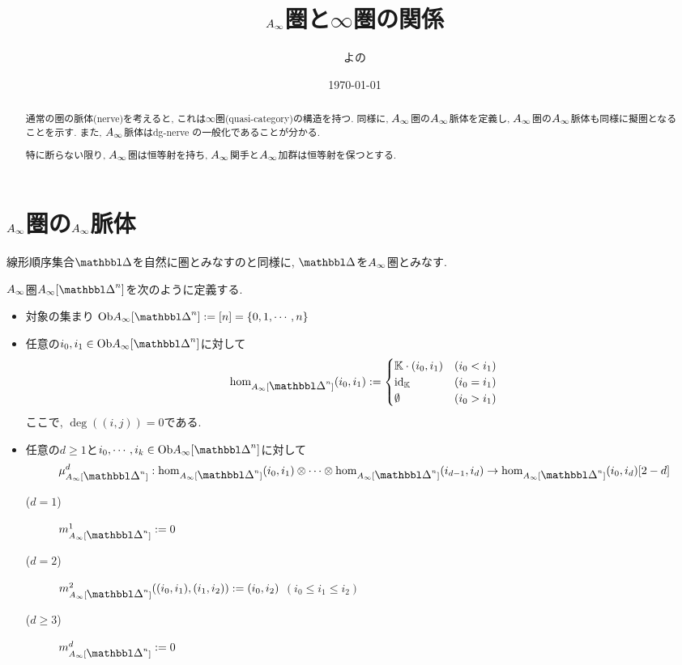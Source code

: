 \documentclass[uplatex, a4paper, 14Q, dvipdfmx]{jsarticle}
\title{\texorpdfstring{$A_{\infty}$}{Ainf}圏と\texorpdfstring{$\infty$}{infty}圏の関係}
\author{よの}
\date{\today}
\begin{document}
\maketitle

\begin{abstract}
  通常の圏の脈体(nerve)を考えると, これは$\infty$圏(quasi-category)の構造を持つ.
  同様に, $A_{\infty}$圏の$A_{\infty}$脈体を定義し, $A_{\infty}$圏の$A_{\infty}$脈体も同様に擬圏となることを示す. \cite{Fao}
  また, $A_{\infty}$脈体はdg-nerve \cite{Lurie08}の一般化であることが分かる. 

  特に断らない限り, $A_{\infty}$圏は恒等射を持ち, $A_{\infty}$関手と$A_{\infty}$加群は恒等射を保つとする.
\end{abstract}

\tableofcontents

\section{\texorpdfstring{$A_{\infty}$}{Ainf}圏の\texorpdfstring{$A_{\infty}$}{Ainf}脈体}

線形順序集合$\Prism$を自然に圏とみなすのと同様に, $\Prism$を$A_{\infty}$圏とみなす. 

\begin{definition} \label{def_Ainf_Delta}
  $A_{\infty}$圏$\Ainf[\Prism^n]$を次のように定義する. 
  \begin{itemize}
    \item 対象の集まり $\Ob\Ainf[\Prism^n] := [n] = \{0,1,\cdots,n\}$
    \item 任意の$i_0,i_1 \in \Ob\Ainf[\Prism^n]$に対して 
    \begin{align*}
      \hom_{\Ainf[\Prism^n]}(i_0,i_1) := 
      \begin{cases}
        \bbK \cdot (i_0,i_1) & (i_0 < i_1) \\
        \id_\bbK & (i_0 = i_1) \\
        \emptyset & (i_0 > i_1)
      \end{cases}
    \end{align*}
    ここで, $\deg((i,j))=0$である. %
    \item 任意の$d \geq 1$と$i_0,\cdots,i_k \in \Ob\Ainf[\Prism^n]$に対して
    \begin{align*}
      \mu_{\Ainf[\Prism^n]}^d : \hom_{\Ainf[\Prism^n]}(i_0,i_1) \otimes \cdots \otimes \hom_{\Ainf[\Prism^n]}(i_{d-1},i_d) \to \hom_{\Ainf[\Prism^n]}(i_0,i_d)[2-d]
    \end{align*}
    \begin{description}
      \item[($d=1$)] $m_{\Ainf[\Prism^n]}^1 := 0$
      \item[($d=2$)] $m_{\Ainf[\Prism^n]}^2((i_0,i_1),(i_1,i_2)) := (i_0,i_2)$ $(i_0 \leq i_1 \leq i_2)$
      \item[($d \geq 3$)] $m_{\Ainf[\Prism^n]}^d := 0$ 
    \end{description}
  \end{itemize}
\end{definition}
\end{document}
